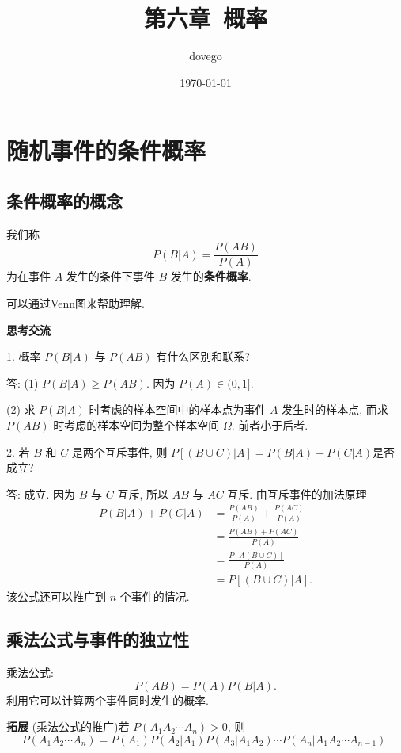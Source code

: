 \documentclass[titlepage]{ctexart}
\title{第六章~概率}
\author{dovego}
\date{\today}
\begin{document}
\maketitle


\section{随机事件的条件概率}

\subsection{条件概率的概念}

我们称
\[
P(B|A) = \frac{P(AB)}{P(A)}
\]
为在事件 $A$ 发生的条件下事件 $B$ 发生的\textbf{条件概率}.

可以通过Venn图来帮助理解.

\vspace{1cm}

\noindent \textbf{思考交流}

1. 概率 $P(B|A)$ 与 $P(AB)$ 有什么区别和联系?

答: (1) $P(B|A) \geqslant P(AB)$. 因为 $P(A) \in (0,1]$.

(2) 求 $P(B|A)$ 时考虑的样本空间中的样本点为事件 $A$ 发生时的样本点, 而求 $P(AB)$ 时考虑的样本空间为整个样本空间 $\varOmega$. 前者小于后者.

2. 若 $B$ 和 $C$ 是两个互斥事件, 则 $P[(B \cup C)|A] = P(B|A) + P(C|A)$是否成立?

答: 成立. 因为 $B$ 与 $C$ 互斥, 所以 $AB$ 与 $AC$ 互斥. 由互斥事件的加法原理
\begin{align*}
    P(B|A) + P(C|A) &= \frac{P(AB)}{P(A)} + \frac{P(AC)}{P(A)} \\
                    &= \frac{P(AB)+P(AC)}{P(A)} \\
                    &= \frac{P[A(B \cup C)]}{P(A)} \\
                    &= P[(B \cup C)|A].
\end{align*}
该公式还可以推广到 $n$ 个事件的情况.

\subsection{乘法公式与事件的独立性}

乘法公式:
\[
P(AB) = P(A)P(B|A).
\]
利用它可以计算两个事件同时发生的概率. 

\textbf{拓展} \quad
(乘法公式的推广)若 $P(A_{1}A_{2}\cdots A_{n}) > 0$, 则
\[
P(A_{1}A_{2}\cdots A_{n}) = P(A_{1})P(A_{2}|A_{1})P(A_{3}|A_{1}A_{2})\cdots P(A_{n}|A_{1}A_{2}\cdots A_{n-1}).
\]
\end{document}
